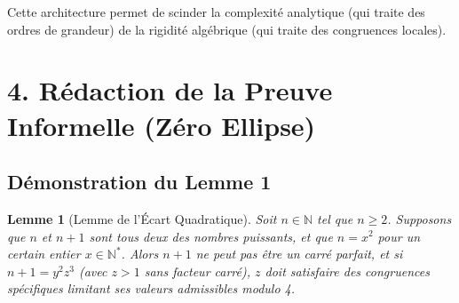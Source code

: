 \documentclass[11pt,a4paper]{article}
\newtheorem{lemma}[theorem]{Lemme}
\begin{document}
Cette architecture permet de scinder la complexité analytique (qui traite des ordres de grandeur) de la rigidité algébrique (qui traite des congruences locales).

\newpage
\section{4. Rédaction de la Preuve Informelle (Zéro Ellipse)}

\subsection{Démonstration du Lemme 1}

\begin{lemma}[Lemme de l'Écart Quadratique]
Soit $n \in \mathbb{N}$ tel que $n \ge 2$. Supposons que $n$ et $n+1$ sont tous deux des nombres puissants, et que $n = x^2$ pour un certain entier $x \in \mathbb{N}^*$. Alors $n+1$ ne peut pas être un carré parfait, et si $n+1 = y^2 z^3$ (avec $z > 1$ sans facteur carré), $z$ doit satisfaire des congruences spécifiques limitant ses valeurs admissibles modulo 4.
\end{lemma}
\end{document}
